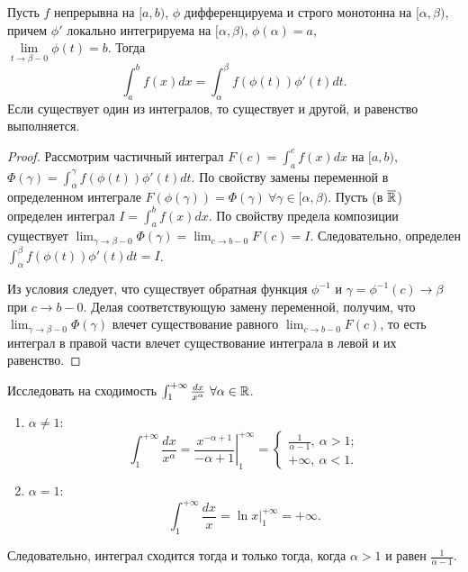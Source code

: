 
\begin{property}
    Пусть $f$ непрерывна на $[a, b)$, $\phi$ дифференцируема и строго монотонна на $[\alpha, \beta)$, причем $\phi'$ локально интегрируема на $[\alpha, \beta)$, $\phi(\alpha) = a$, \\
    $\underset{t \to \beta - 0}{\lim}\phi(t)= b$. Тогда
    \[
        \int_{a}^{b} f(x) dx = \int_{\alpha}^{\beta} f(\phi(t)) \phi'(t) dt.
    \]
    Если существует один из интегралов, то существует и другой, и равенство выполняется.
\end{property}

\begin{proof}
    Рассмотрим частичный интеграл $F(c) = \int_{a}^{c} f(x) dx$ на $[a, b)$, $\Phi(\gamma) = \int_{\alpha}^{\gamma} f(\phi(t)) \phi'(t) dt$. По свойству замены переменной в определенном интеграле $F(\phi(\gamma)) = \Phi(\gamma) \ \forall \gamma \in [\alpha, \beta)$. Пусть (в $\overline{\mathbb{R}}$) определен интеграл $I = \int_{a}^{b} f(x) dx$. По свойству предела композиции существует $\lim_{\gamma \to \beta - 0} \Phi(\gamma) = \lim_{c \to b - 0} F(c) = I$. Следовательно, определен $\int_{\alpha}^{\beta} f(\phi(t)) \phi'(t) dt = I$.
    
    Из условия следует, что существует обратная функция $\phi^{-1}$ и $\gamma = \phi^{-1}(c) \to \beta$ при $c \to b - 0$. Делая соответствующую замену переменной, получим, что $\lim_{\gamma \to \beta - 0} \Phi(\gamma)$ влечет существование равного $\lim_{c \to b - 0} F(c)$, то есть интеграл в правой части влечет существование интеграла в левой и их равенство.
\end{proof}

\begin{example}
    Исследовать на сходимость $\int_{1}^{+\infty} \frac{dx}{x^{\alpha}} \ \forall \alpha \in \mathbb{R}$.
\end{example}

\begin{solution}
    \begin{enumerate}
        \item $\alpha \neq 1$:
        \[
            \int_{1}^{+\infty} \frac{dx}{x^{\alpha}} = \left.\frac{x^{-\alpha + 1}}{-\alpha + 1}\right|_{1}^{+\infty} = \begin{cases}
                \frac{1}{\alpha - 1}, \ \alpha > 1; \\
                +\infty, \ \alpha < 1.
            \end{cases}
        \]
        \item $\alpha = 1$:
        \[
            \int_{1}^{+\infty}\frac{dx}{x} = \left.\ln x \right|_{1}^{+\infty} = +\infty.
        \]
    \end{enumerate}
    Следовательно, интеграл сходится тогда и только тогда, когда $\alpha > 1$ и равен $\frac{1}{\alpha - 1}$.
\end{solution}

